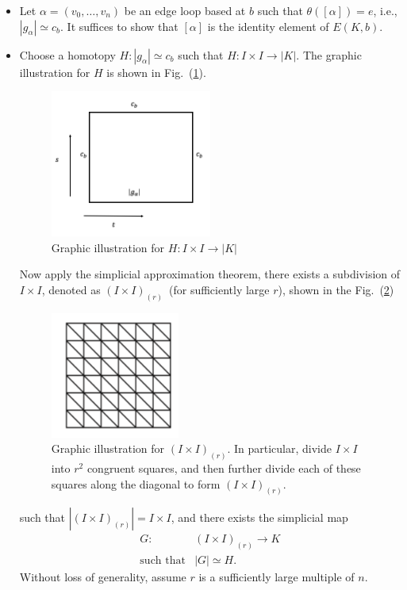 \begin{itemize}
\item
Let $\alpha=(v_0,\dots,v_n)$ be an edge loop based at $b$ such that $\theta([\alpha])=e$, i.e., 
$|g_\alpha|\simeq c_b$.
It suffices to show that $[\alpha]$ is the identity element of $E(K,b)$.
\item
Choose a homotopy $H:|g_\alpha|\simeq c_b$ such that $H:I\times I\to|K|$.
The graphic illustration for $H$ is shown in Fig.~(\ref{fig:13:1}).
\begin{figure}[H]
\centering
\includegraphics[width=0.5\textwidth]{week13/f_24}
\caption{Graphic illustration for $H:I\times I\to|K|$}
\label{fig:13:1}
\end{figure}
Now apply the simplicial approximation theorem, there exists a subdivision of $I\times I$, denoted as $(I\times I)_{(r)}$~(for sufficiently large $r$), shown in the Fig.~(\ref{fig:13:2})
\begin{figure}[H]
\centering
\includegraphics[width=0.4\textwidth]{week13/f_25}
\caption{Graphic illustration for $(I\times I)_{(r)}$.
In particular, divide $I\times I$ into $r^2$ congruent squares, and then further divide each of these squares along the diagonal to form $(I\times I)_{(r)}$.} 
\label{fig:13:2}
\end{figure}
such that $|(I\times I)_{(r)}|=I\times I$, and there exists the simplicial map
\[
\begin{array}{ll}
G:&(I\times I)_{(r)}\to K\\
\text{such that}&|G|\simeq H.
\end{array}
\]
Without loss of generality, assume $r$ is a sufficiently large multiple of $n$.


\end{itemize}
